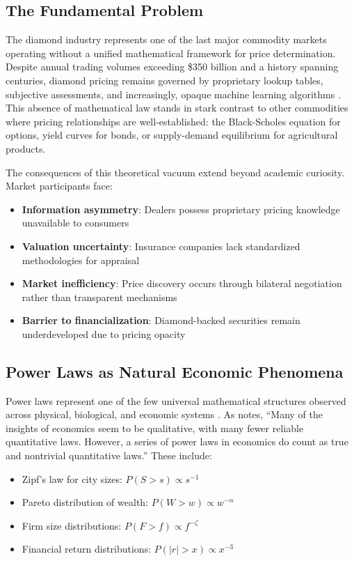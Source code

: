 \documentclass[12pt,a4paper]{article}
\theoremstyle{definition}
\theoremstyle{remark}
\begin{document}
\subsection{The Fundamental Problem}

The diamond industry represents one of the last major commodity markets operating without a unified mathematical framework for price determination. Despite annual trading volumes exceeding \$350 billion and a history spanning centuries, diamond pricing remains governed by proprietary lookup tables, subjective assessments, and increasingly, opaque machine learning algorithms \citep{bain2023global}. This absence of mathematical law stands in stark contrast to other commodities where pricing relationships are well-established: the Black-Scholes equation for options, yield curves for bonds, or supply-demand equilibrium for agricultural products.

The consequences of this theoretical vacuum extend beyond academic curiosity. Market participants face:

\begin{itemize}
\item \textbf{Information asymmetry}: Dealers possess proprietary pricing knowledge unavailable to consumers
\item \textbf{Valuation uncertainty}: Insurance companies lack standardized methodologies for appraisal
\item \textbf{Market inefficiency}: Price discovery occurs through bilateral negotiation rather than transparent mechanisms
\item \textbf{Barrier to financialization}: Diamond-backed securities remain underdeveloped due to pricing opacity
\end{itemize}

\subsection{Power Laws as Natural Economic Phenomena}

Power laws represent one of the few universal mathematical structures observed across physical, biological, and economic systems \citep{newman2005power}. As \citet{gabaix2016power} notes, ``Many of the insights of economics seem to be qualitative, with many fewer reliable quantitative laws. However, a series of power laws in economics do count as true and nontrivial quantitative laws.'' These include:

\begin{itemize}
\item Zipf's law for city sizes: $P(S > s) \propto s^{-1}$
\item Pareto distribution of wealth: $P(W > w) \propto w^{-\alpha}$
\item Firm size distributions: $P(F > f) \propto f^{-\zeta}$
\item Financial return distributions: $P(|r| > x) \propto x^{-3}$
\end{itemize}
\end{document}
